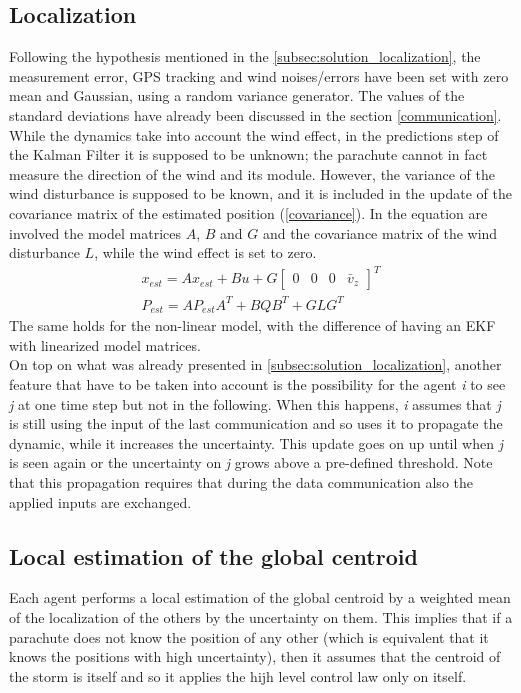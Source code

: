\subsection{Localization}
Following the hypothesis mentioned in the \autoref{subsec:solution_localization}, the measurement error, GPS tracking and wind noises/errors have been set with zero mean and Gaussian, using a random variance generator. The values of the standard deviations have already been discussed in the section \ref{communication}.\\
While the dynamics take into account the wind effect, in the predictions step of the Kalman Filter it is supposed to be unknown; the parachute cannot in fact measure the direction of the wind and its module. However, the variance of the wind disturbance is supposed to be known, and it is included in the update of the covariance matrix of the estimated position (\ref{covariance}). In the equation are involved the model matrices $A$, $B$ and $G$ and the covariance matrix of the wind disturbance $L$, while the wind effect is set to zero.
\begin{gather}
    \label{prediction}
    x_{est} = Ax_{est}+Bu+G\begin{bmatrix}
        0 & 0 & 0 & \bar{v}_z
    \end{bmatrix}^T\\
    \label{covariance}
    P_{est} = AP_{est}A^T+BQB^T+GLG^T
\end{gather}
The same holds for the non-linear model, with the difference of having an EKF with linearized model matrices.\\
On top on what was already presented in \autoref{subsec:solution_localization}, another feature that have to be taken into account is the possibility for the agent \textit{i} to see \textit{j} at one time step but not in the following. When this happens, \textit{i} assumes that \textit{j} is still using the input of the last communication and so uses it to propagate the dynamic, while it increases the uncertainty. This update goes on up until when \textit{j} is seen again or the uncertainty on \textit{j} grows above a pre-defined threshold. Note that this propagation requires that during the data communication also the applied inputs are exchanged.

\subsection{Local estimation of the global centroid}
Each agent performs a local estimation of the global centroid by a weighted mean of the localization of the others by the uncertainty on them. This implies that if a parachute does not know the position of any other (which is equivalent that it knows the positions with high uncertainty), then it assumes that the centroid of the storm is itself and so it applies the hijh level control law only on itself. 

